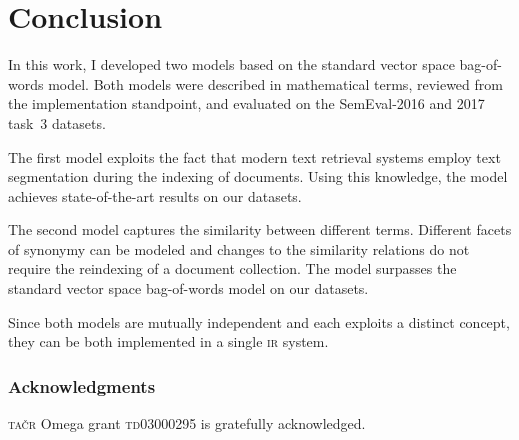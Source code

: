 \documentclass[
  digital, %
  notable, %
  lof,     %
  lot,     %
  nopalatino, color
]{fithesis3}
\newif\ifreview\reviewfalse
\def\abbr#1{\textsc{\MakeLowercase{#1}}}
\begin{document}
\chapter{Conclusion}
\label{chap:conclusion}
In this work, I developed two models based on the standard vector space
bag-of-words model. Both models were
described in mathematical terms, reviewed from the implementation standpoint,
and evaluated on the SemEval-2016 and 2017 task~3 datasets.

The first model exploits the fact that modern text retrieval systems employ
text segmentation during the indexing of documents. Using this knowledge, the
model achieves state-of-the-art results on our datasets.

The second model captures the similarity between different terms. Different
facets of synonymy can be modeled and changes to the similarity relations do
not require the reindexing of a document collection. The model surpasses the
standard vector space bag-of-words model on our datasets.

Since both models are mutually independent and each exploits a distinct
concept, they can be both implemented in a single \abbr{IR}\index{ir@\abbr {IR}} system.

\ifreview\else
\subsection*{Acknowledgments}
\abbr{\noexpand\MakeUppercase TAČR} Omega grant \abbr{TD03000295} is gratefully acknowledged.
\fi

\nocite{ir:Zezula2006} %
\nocite{ml:IntroIR2008}
\nocite{mikolov2013efficient}
\begingroup\sloppy
\printbibliography[heading=bibintoc]
\endgroup

\makeatletter\thesis@blocks@clear\makeatother
{} %
\printindex

\end{document}
